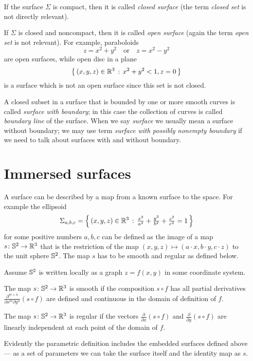 If the surface $\Sigma$ is compact, then it is called \emph{closed surface} (the term \emph{closed set} is not directly relevant).

If $\Sigma$ is closed and noncompact, then it is called  \emph{open surface} (again the term \emph{open set} is not relevant).
For example, paraboloids 
\[z=x^2+y^2\quad\text{or}\quad z=x^2-y^2\]
are open surfaces, while
open disc in a plane 
\[\left\{\,{(x,y,z)\in\mathbb{R}^3}\,:\,{x^2+y^2<1, z=0}\,\right\}\]
is a surface which is not an open surface since this set is not closed. 

A closed subset in a surface that is bounded by one or more smooth curves is called \emph{surface with boundary}; in this case the collection of curves is called \emph{boundary line} of the surface.
When we say \emph{surface} we usually mean a surface without boundary;
we may use term \emph{surface with possibly nonempty boundary} if we need to talk about surfaces with and without boundary.

\section{Immersed surfaces}

A surface can be described by a map from a known surface to the space.
For example the ellipsoid
\[\Sigma_{a,b,c}=\left\{\,{(x,y,z)\in\mathbb{R}^3}\,:\,{\tfrac{x^2}{a^2}+\tfrac{y^2}{b^2}+\tfrac{z^2}{c^2}=1}\,\right\}\]
for some positive numbers $a,b,c$ can be defined as the image of a map $s\colon\mathbb{S}^2\to\mathbb{R}^3$ that is the restriction of the map $(x,y,z)\mapsto (a\cdot x, b\cdot y,c\cdot z)$ to the unit sphere $\mathbb{S}^2$.
The map $s$ has to be smooth and regular as defined below. 

Assume $\mathbb{S}^2$ is written locally as a graph $z=f(x,y)$ in some coordinate system.

The map $s\colon\mathbb{S}^2\to \mathbb{R}^3$ is  smooth if the composition $s\circ f$ has all partial derivatives $\frac{\partial^{m+n}}{\partial x^m\partial y^n}(s\circ f)$ are defined and continuous in the domain of definition of $f$.

The map $s\colon\mathbb{S}^2\to \mathbb{R}^3$ is regular
if the vectors $\frac{\partial}{\partial x}(s\circ f)$ and $\frac{\partial}{\partial y}(s\circ f)$ are linearly independent at each point of the domain of $f$.

Evidently the parametric definition includes the embedded surfaces defined above --- as a set of parameters we can take the surface itself and the identity map as $s$.

